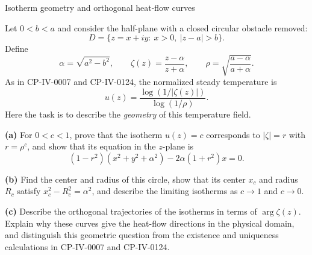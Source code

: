 \begin{problem}[CP-IV-0135]
\label{prob:cp-iv-0135}
Isotherm geometry and orthogonal heat-flow curves

Let $0<b<a$ and consider the half-plane with a closed circular obstacle removed:
\[
D=\{z=x+iy:\ x>0,\ |z-a|>b\}.
\]
Define
\[
\alpha=\sqrt{a^2-b^2},\qquad
\zeta(z)=\frac{z-\alpha}{z+\alpha},\qquad
\rho=\sqrt{\frac{a-\alpha}{a+\alpha}}.
\]
As in CP-IV-0007 and CP-IV-0124, the normalized steady temperature is
\[
u(z)=\frac{\log(1/|\zeta(z)|)}{\log(1/\rho)}.
\]
Here the task is to describe the \emph{geometry} of this temperature field.

\par\noindent\textbf{(a)} For $0<c<1$, prove that the isotherm
$u(z)=c$ corresponds to $|\zeta|=r$ with $r=\rho^c$, and show that
its equation in the $z$-plane is
\[
(1-r^2)(x^2+y^2+\alpha^2)-2\alpha(1+r^2)x=0.
\]

\par\noindent\textbf{(b)} Find the center and radius of this circle,
show that its center $x_c$ and radius $R_c$ satisfy
$x_c^2-R_c^2=\alpha^2$, and describe the limiting isotherms as
$c\to1$ and $c\to0$.

\par\noindent\textbf{(c)} Describe the orthogonal trajectories of the
isotherms in terms of $\arg\zeta(z)$. Explain why these curves give the
heat-flow directions in the physical domain, and distinguish this
geometric question from the existence and uniqueness calculations in
CP-IV-0007 and CP-IV-0124.

\end{problem}



